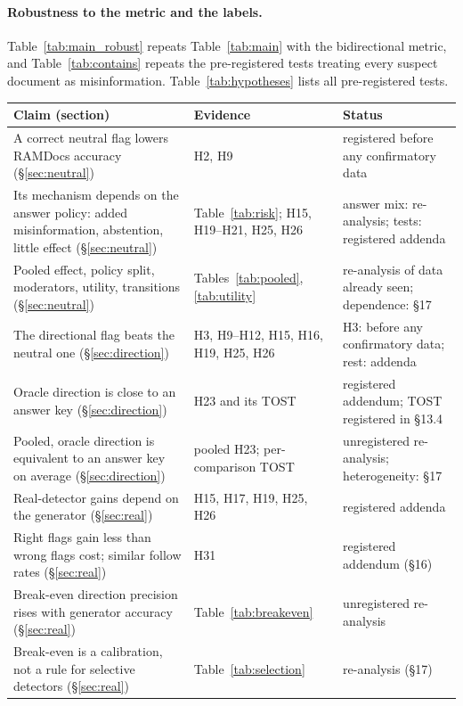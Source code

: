 \paragraph{Robustness to the metric and the labels.}
Table~\ref{tab:main_robust} repeats Table~\ref{tab:main} with the bidirectional metric, and Table~\ref{tab:contains}
repeats the pre-registered tests treating every suspect document as misinformation. Table~\ref{tab:hypotheses}
lists all pre-registered tests.

\begin{table}[t]
\centering\footnotesize
\setlength{\tabcolsep}{4pt}
\begin{tabular}{p{7.4cm}p{3.6cm}p{4.2cm}}
\toprule
Claim (section) & Evidence & Status \\
\midrule
A correct neutral flag lowers RAMDocs accuracy (\S\ref{sec:neutral}) & H2, H9 & registered before any confirmatory data \\
Its mechanism depends on the answer policy: added misinformation, abstention, little effect (\S\ref{sec:neutral}) & Table~\ref{tab:risk}; H15, H19--H21, H25, H26 & answer mix: re-analysis; tests: registered addenda \\
Pooled effect, policy split, moderators, utility, transitions (\S\ref{sec:neutral}) & Tables~\ref{tab:pooled}, \ref{tab:utility} & re-analysis of data already seen; dependence: \S17 \\
The directional flag beats the neutral one (\S\ref{sec:direction}) & H3, H9--H12, H15, H16, H19, H25, H26 & H3: before any confirmatory data; rest: addenda \\
Oracle direction is close to an answer key (\S\ref{sec:direction}) & H23 and its TOST & registered addendum; TOST registered in \S13.4 \\
Pooled, oracle direction is equivalent to an answer key on average (\S\ref{sec:direction}) & pooled H23; per-comparison TOST & unregistered re-analysis; heterogeneity: \S17 \\
Real-detector gains depend on the generator (\S\ref{sec:real}) & H15, H17, H19, H25, H26 & registered addenda \\
Right flags gain less than wrong flags cost; similar follow rates (\S\ref{sec:real}) & H31 & registered addendum (\S16) \\
Break-even direction precision rises with generator accuracy (\S\ref{sec:real}) & Table~\ref{tab:breakeven} & unregistered re-analysis \\
Break-even is a calibration, not a rule for selective detectors (\S\ref{sec:real}) & Table~\ref{tab:selection} & re-analysis (\S17) \\

\end{tabular}
\end{table}
